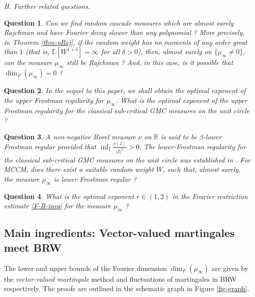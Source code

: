 \documentclass[12pt]{amsart}
\newtheorem{question}{Question}
\theoremstyle{definition}
\theoremstyle{remark}
\newcommand{\R}{\mathbb{R}}
\newcommand{\E}{\mathbb{E}}
\numberwithin{equation}{section}
\begin{document}
{\flushleft \it H. Further related questions.}



\begin{question}
Can we find random cascade measures which are almost surely Rajchman and have Fourier decay slower than any polynomial ? More precisely, 
in Theorem \ref{thm-pRaj},  if   the random weight has no moments of any order great than $1$ (that is, $\E[W^{1+\delta}]  = \infty$ for all $\delta> 0$), then, almost surely on $\{\mu_\infty\ne 0\}$, can  the measure $\mu_\infty$ still be Rajchman ? And, in this case, is it possible that   $\dim_F(\mu_\infty) =  0$ ? 
\end{question}





\begin{question}
 In the sequel to this paper,  we shall  obtain  the optimal  exponent  of the upper Frostman regularity for  $\mu_\infty$.   What is the optimal exponent of the upper Frostman regularity for the classical sub-critical GMC measures on the unit circle ? 
\end{question}



\begin{question}
A non-negative Borel measure  $\nu$  on $\R$ is said to be $\beta$-lower Frostman regular provided that 
$
\inf_{I  }   \frac{\nu(I)}{|I|^\beta}> 0. 
$
The lower-Frostman regularity for the classical sub-critical GMC measures on the unit circle was established in \cite[Theorem 3.7]{AJKS}.  For MCCM, does there exist a suitable random weight $W$, such that, 
almost surely,  the  measure $\mu_\infty$ is lower Frostman regular ?  
\end{question}


\begin{question}
What is the optimal exponent $r\in (1,2)$ in the Fourier restriction estimate \eqref{F-R-ineq} for the measure $\mu_\infty$ ?  
\end{question}






\subsection{Main ingredients:  Vector-valued martingales meet BRW}

The lower and upper  bounds of the Fourier dimension $\dim_F(\mu_\infty)$ are given by the {\it vector-valued martingale} method and fluctuations of martingales in BRW respectively.   The proofs are outlined in the   schematic graph in   Figure \ref{fig-graph}.  
\end{document}
